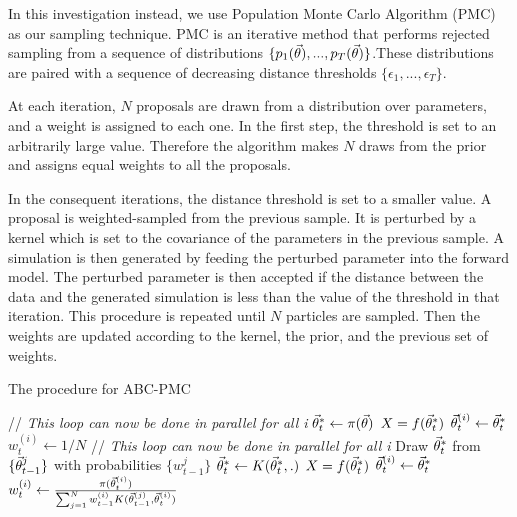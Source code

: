 In this investigation instead, we use Population Monte Carlo Algorithm (PMC) as our sampling technique. PMC is an iterative method that performs rejected sampling from a sequence of distributions $\{p_{1}(\vec{\theta}),...,p_{T}(\vec{\theta})\}$.These distributions are paired with a sequence of decreasing distance thresholds $\{\epsilon_{1} , ... , \epsilon_{T}\}$.

At each iteration, $N$ proposals are drawn from a distribution over parameters, and a weight is assigned to each one. In the first step, the threshold is set to an arbitrarily large value. Therefore the algorithm makes $N$ draws from the prior and assigns equal weights to all the proposals.

In the consequent iterations, the distance threshold is set to a smaller value. A proposal is weighted-sampled from the previous sample. It is perturbed by a kernel which is set to the covariance of the parameters in the previous sample. A simulation is then generated by feeding the perturbed parameter into the forward model. The perturbed parameter is then accepted if the distance between the data and the generated simulation is less than the value of the threshold in that iteration. This procedure is repeated until $N$ particles are sampled. Then the weights are updated according to the kernel, the prior, and the previous set of weights.

\begin{algorithm}
\caption{The procedure for ABC-PMC}
\begin{algorithmic}[1]
   \STATE // \emph{This loop can now be done in parallel for all i}
   \STATE $\vec{\theta}^{*}_{t} \gets \pi(\vec{\theta})$
   \STATE $X = f(\vec{\theta}^{*}_{t})$
   \ENDWHILE
   \STATE $\vec{\theta}^{(i)}_{t} \gets \vec{\theta}^{*}_{t}$
   \STATE $w^{(i)}_{t} \gets 1/N$
\ENDFOR
\ENDIF
{}
   \STATE // \emph{This loop can now be done in parallel for all i}
   \STATE Draw $\vec{\theta}^{*}_{t}$ from $\{\vec{\theta}^{j}_{t-1}\}$ with probabilities $\{w^{j}_{t-1}\}$
   \STATE $\vec{\theta}^{*}_{t} \gets K(\vec{\theta}^{*}_{t},.)$
   \STATE $X = f(\vec{\theta}^{*}_{t})$
   \ENDWHILE
   \STATE $\vec{\theta}^{(i)}_{t} \gets \vec{\theta}^{*}_{t}$
   \STATE $w^{(i)}_{t} \gets \frac{\pi(\vec{\theta}^{(i)}_{t})}{\sum_{j=1}^{N}w_{t-1}^{(i)}K(\vec{\theta}^{(j)}_{t-1},\vec{\theta}^{(i)}_{t})}$
\ENDFOR
\ENDIF
\end{algorithmic}
\end{algorithm}

